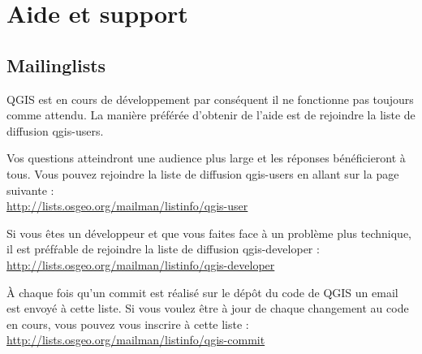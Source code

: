 
\section{Aide et support}\label{label_helpsupport}


\subsection{Mailinglists}
QGIS est en cours de développement par conséquent il ne fonctionne pas toujours
comme attendu. La manière préférée d'obtenir de l'aide est de rejoindre la
liste de diffusion qgis-users.

Vos questions atteindront une audience plus large et les réponses bénéficieront
à tous. Vous pouvez rejoindre la liste de diffusion qgis-users en allant sur la
page suivante : \\
\url{http://lists.osgeo.org/mailman/listinfo/qgis-user}

Si vous êtes un développeur et que vous faites face à un problème plus
technique, il est préf\'rable de rejoindre la liste de diffusion qgis-developer :\\
\url{http://lists.osgeo.org/mailman/listinfo/qgis-developer}

À chaque fois qu'un commit est réalisé sur le dépôt du code de QGIS un email
est envoyé à cette liste. Si vous voulez être à jour de chaque changement au
code en cours, vous pouvez vous inscrire à cette liste :\\
\url{http://lists.osgeo.org/mailman/listinfo/qgis-commit}

